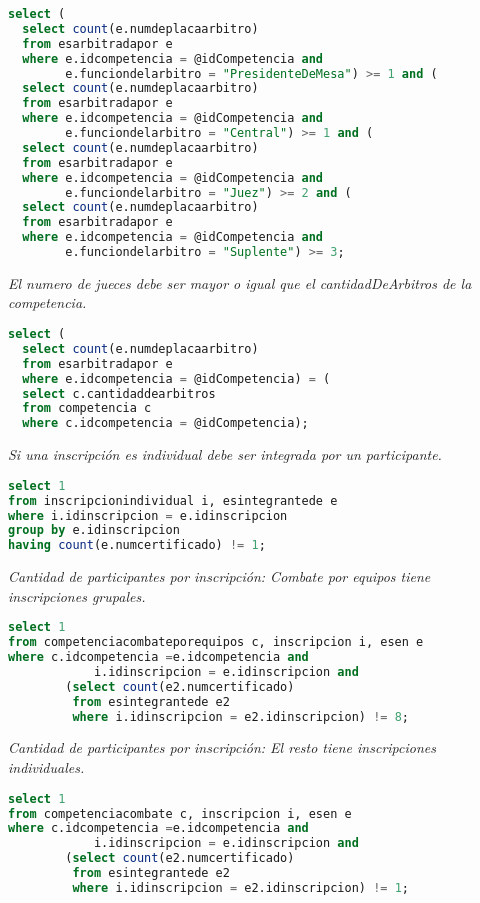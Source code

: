 \begin{lstlisting}[language=SQL]
select (
  select count(e.numdeplacaarbitro)
  from esarbitradapor e
  where e.idcompetencia = @idCompetencia and
        e.funciondelarbitro = "PresidenteDeMesa") >= 1 and (
  select count(e.numdeplacaarbitro)
  from esarbitradapor e
  where e.idcompetencia = @idCompetencia and
        e.funciondelarbitro = "Central") >= 1 and (
  select count(e.numdeplacaarbitro)
  from esarbitradapor e
  where e.idcompetencia = @idCompetencia and
        e.funciondelarbitro = "Juez") >= 2 and (
  select count(e.numdeplacaarbitro)
  from esarbitradapor e
  where e.idcompetencia = @idCompetencia and
        e.funciondelarbitro = "Suplente") >= 3;
\end{lstlisting}

\emph{El numero de jueces debe ser mayor o igual que el cantidadDeArbitros de la competencia.}

\begin{lstlisting}[language=SQL]
select (
  select count(e.numdeplacaarbitro)
  from esarbitradapor e
  where e.idcompetencia = @idCompetencia) = (
  select c.cantidaddearbitros
  from competencia c
  where c.idcompetencia = @idCompetencia);
\end{lstlisting}

\emph{Si una inscripción es individual debe ser integrada por un participante.}

\begin{lstlisting}[language=SQL]
select 1
from inscripcionindividual i, esintegrantede e
where i.idinscripcion = e.idinscripcion
group by e.idinscripcion
having count(e.numcertificado) != 1;
\end{lstlisting}

\emph{Cantidad de participantes por inscripción: Combate por equipos tiene inscripciones grupales.}

\begin{lstlisting}[language=SQL]
select 1
from competenciacombateporequipos c, inscripcion i, esen e
where c.idcompetencia =e.idcompetencia and
            i.idinscripcion = e.idinscripcion and
	    (select count(e2.numcertificado)
	     from esintegrantede e2
	     where i.idinscripcion = e2.idinscripcion) != 8;
\end{lstlisting}

\emph{Cantidad de participantes por inscripción: El resto tiene inscripciones individuales.}

\begin{lstlisting}[language=SQL]
select 1
from competenciacombate c, inscripcion i, esen e
where c.idcompetencia =e.idcompetencia and
            i.idinscripcion = e.idinscripcion and
	    (select count(e2.numcertificado)
	     from esintegrantede e2
	     where i.idinscripcion = e2.idinscripcion) != 1;
\end{lstlisting}

